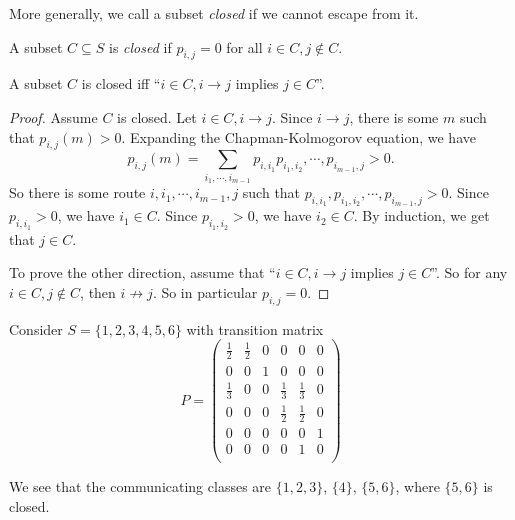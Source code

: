 \documentclass[a4paper]{article}
\begin{document}
More generally, we call a subset \emph{closed} if we cannot escape from it.
\begin{defi}[Closed]
  A subset $C\subseteq S$ is \emph{closed} if $p_{i, j} = 0$ for all $i \in C, j\not\in C$.
\end{defi}

\begin{prop}
  A subset $C$ is closed iff ``$i\in C, i\to j$ implies $j \in C$''.
\end{prop}

\begin{proof}
  Assume $C$ is closed. Let $i \in C, i \to j$. Since $i \to j$, there is some $m$ such that $p_{i, j}(m) > 0$. Expanding the Chapman-Kolmogorov equation, we have
  \[
    p_{i, j}(m) = \sum_{i_1, \cdots, i_{m - 1}} p_{i, i_1}p_{i_1, i_2}, \cdots, p_{i_{m - 1},j} > 0.
  \]
  So there is some route $i, i_1, \cdots, i_{m - 1}, j$ such that $p_{i, i_1}, p_{i_1, i_2}, \cdots, p_{i_{m - 1}, j} > 0$. Since $p_{i, i_1} > 0$, we have $i_1\in C$. Since $p_{i_1,i_2} > 0$, we have $i_2\in C$. By induction, we get that $j \in C$.

  To prove the other direction, assume that ``$i\in C, i \to j$ implies $j\in C$''. So for any $i\in C, j\not\in C$, then $i\not\to j$. So in particular $p_{i, j} = 0$.
\end{proof}

\begin{eg}
  Consider $S = \{1, 2, 3, 4, 5, 6\}$ with transition matrix
  \[
    P =
    \begin{pmatrix}
      \frac{1}{2} & \frac{1}{2} & 0 & 0 & 0 & 0\\
      0 & 0 & 1 & 0 & 0 & 0\\
      \frac{1}{3} & 0 & 0 & \frac{1}{3} & \frac{1}{3} & 0\\
      0 & 0 & 0 & \frac{1}{2} & \frac{1}{2} & 0\\
      0 & 0 & 0 & 0 & 0 & 1\\
      0 & 0 & 0 & 0 & 1 & 0\\
    \end{pmatrix}
  \]
  \begin{center}
  \end{center}
  We see that the communicating classes are $\{1, 2, 3\}$, $\{4\}$, $\{5, 6\}$, where $\{5, 6\}$ is closed.
\end{eg}
\end{document}
